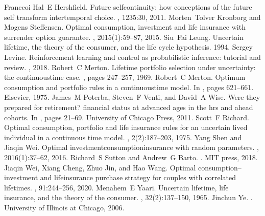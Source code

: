 \documentclass[letterpaper,10pt,english]{jupyterBook}
\begin{document}
\begin{sphinxthebibliography}{Franccoi}
\sphinxAtStartPar
Hal E Hershfield. Future self\sphinxhyphen{}continuity: how conceptions of the future self transform intertemporal choice. , 1235:30, 2011.
\sphinxAtStartPar
Morten Tolver Kronborg and Mogens Steffensen. Optimal consumption, investment and life insurance with surrender option guarantee. , 2015(1):59–87, 2015.
\sphinxAtStartPar
Siu Fai Leung. Uncertain lifetime, the theory of the consumer, and the life cycle hypothesis. 1994.
\sphinxAtStartPar
Sergey Levine. Reinforcement learning and control as probabilistic inference: tutorial and review. , 2018.
\sphinxAtStartPar
Robert C Merton. Lifetime portfolio selection under uncertainty: the continuous\sphinxhyphen{}time case. , pages 247–257, 1969.
\sphinxAtStartPar
Robert C Merton. Optimum consumption and portfolio rules in a continuous\sphinxhyphen{}time model. In , pages 621–661. Elsevier, 1975.
\sphinxAtStartPar
James M Poterba, Steven F Venti, and David A Wise. Were they prepared for retirement? financial status at advanced ages in the hrs and ahead cohorts. In , pages 21–69. University of Chicago Press, 2011.
\sphinxAtStartPar
Scott F Richard. Optimal consumption, portfolio and life insurance rules for an uncertain lived individual in a continuous time model. , 2(2):187–203, 1975.
\sphinxAtStartPar
Yang Shen and Jiaqin Wei. Optimal investment\sphinxhyphen{}consumption\sphinxhyphen{}insurance with random parameters. , 2016(1):37–62, 2016.
\sphinxAtStartPar
Richard S Sutton and Andrew G Barto. . MIT press, 2018.
\sphinxAtStartPar
Jiaqin Wei, Xiang Cheng, Zhuo Jin, and Hao Wang. Optimal consumption–investment and life\sphinxhyphen{}insurance purchase strategy for couples with correlated lifetimes. , 91:244–256, 2020.
\sphinxAtStartPar
Menahem E Yaari. Uncertain lifetime, life insurance, and the theory of the consumer. , 32(2):137–150, 1965.
\sphinxAtStartPar
Jinchun Ye. . University of Illinois at Chicago, 2006.
\end{sphinxthebibliography}







\renewcommand{\indexname}{Index}
\printindex
\end{document}
